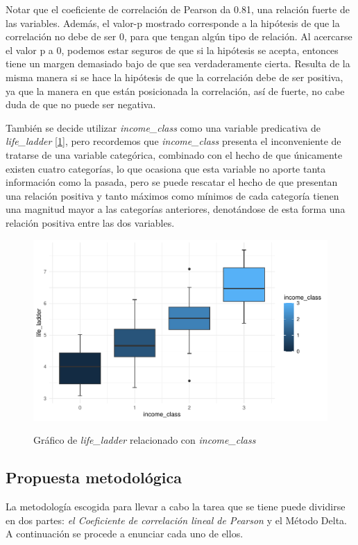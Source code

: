 Notar que el coeficiente de correlación de Pearson da 0.81, una relación fuerte de las variables. Además, el valor-p mostrado corresponde a la hipótesis de que la correlación no debe de ser 0, para que tengan algún tipo de relación. Al acercarse el valor p a 0, podemos estar seguros de que si la hipótesis se acepta, entonces tiene un margen demasiado bajo de que sea verdaderamente cierta. Resulta de la misma manera si se hace la hipótesis de que la correlación debe de ser positiva, ya que la manera en que están posicionada la correlación, así de fuerte, no cabe duda de que no puede ser negativa.

\pagebreak

También se decide utilizar \textit{income\_class} como una variable predicativa de \textit{life\_ladder} [\ref{fig:income_life}], pero recordemos que \textit{income\_class} presenta el inconveniente de tratarse de una variable categórica, combinado con el hecho de que únicamente existen cuatro categorías, lo que ocasiona que esta variable no aporte tanta información como la pasada, pero se puede rescatar el hecho de que presentan una relación positiva y tanto máximos como mínimos de cada categoría tienen una magnitud mayor a las categorías anteriores, denotándose de esta forma una relación positiva entre las dos variables.

\begin{figure}[H]
    \centering
    \caption{Gráfico de \textit{life\_ladder} relacionado con \textit{income\_class}}
    \includegraphics[width=1\textwidth]{figures/income_life.pdf}
    \label{fig:income_life}
\end{figure}

\newpage

\subsection{Propuesta metodológica}
La metodología escogida para llevar a cabo la tarea que se tiene puede dividirse en dos partes: \textit{el Coeficiente de correlación lineal de Pearson} y \textit{}{el Método Delta}. A continuación se procede a enunciar cada uno de ellos.

